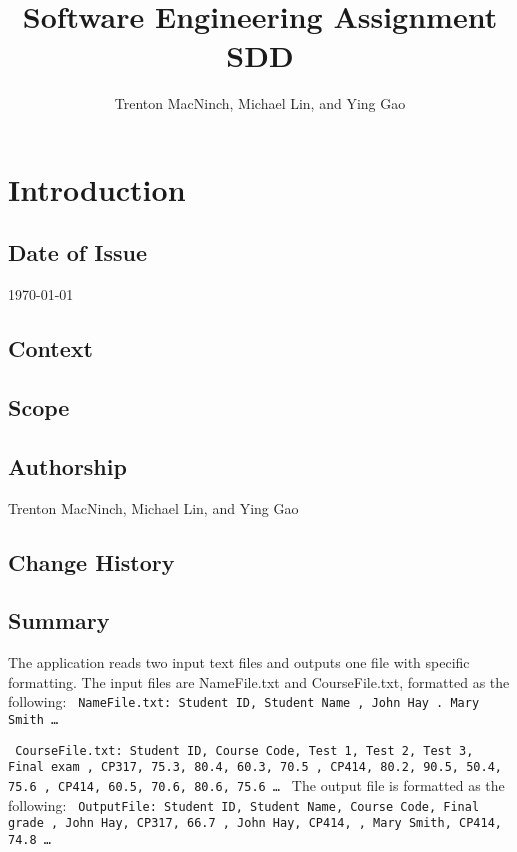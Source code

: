 \documentclass{article}
\title{\textbf{Software Engineering Assignment SDD}}
\author{Trenton MacNinch, Michael Lin, and Ying Gao}
\begin{document}
\maketitle
\newpage

\tableofcontents
\newpage

\section{Introduction}
\subsection{Date of Issue}
\today
\subsection{Context}
\subsection{Scope}
\subsection{Authorship}
Trenton MacNinch, Michael Lin, and Ying Gao
\subsection{Change History}
\subsection{Summary}
The application reads two input text files and outputs one file with specific formatting.
The input files are NameFile.txt and CourseFile.txt, formatted as the following:
\texttt{ \newline
  NameFile.txt: \newline
  Student ID, Student Name , John Hay . Mary Smith \newline
  \ldots
}

\texttt{ \newline
  CourseFile.txt: \newline
  Student ID, Course Code, Test 1, Test 2, Test 3, Final exam , CP317, 75.3, 80.4, 60.3, 70.5 , CP414, 80.2, 90.5, 50.4, 75.6 , CP414, 60.5, 70.6, 80.6, 75.6 \newline
  \ldots
}
\newline \newline
The output file is formatted as the following:
\texttt{ \newline
  OutputFile: \newline
  Student ID, Student Name, Course Code, Final grade , John Hay, CP317, 66.7 , John Hay, CP414, , Mary Smith, CP414, 74.8 \newline
  \ldots
}
\end{document}
